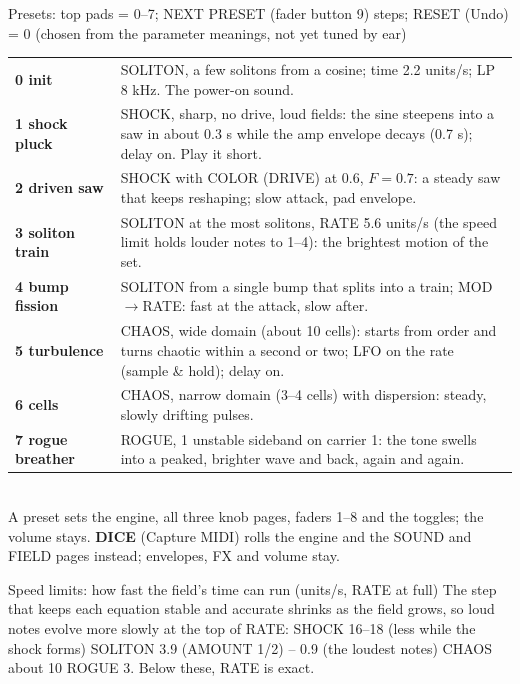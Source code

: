 \documentclass{article}
\newcommand{\EN}[1]{\textcolor{engc}{#1}}
\begin{document}
\vspace{1.5mm}
\begin{minipage}[t]{150mm}\vspace{0pt}
\begin{card}{Presets: top pads = 0--7; NEXT PRESET (fader button 9) steps; RESET (Undo) = 0 \quad\textmd{\fontsize{6.5}{7}\selectfont (chosen from the parameter meanings, not yet tuned by ear)}}
\fontsize{7.2}{8.7}\selectfont
\begin{tabularx}{\linewidth}{@{}>{\bfseries}l L@{}}
0 init & SOLITON, a few solitons from a cosine; time 2.2 units/s; LP 8 kHz. The power-on sound. \\
1 shock pluck & SHOCK, sharp, no drive, loud fields: the sine steepens into a saw in about 0.3 s while the
amp envelope decays (0.7 s); delay on. Play it short. \\
2 driven saw & SHOCK with COLOR (DRIVE) at 0.6, \(F = 0.7\): a steady saw that keeps reshaping; slow attack, pad envelope. \\
3 soliton train & SOLITON at the most solitons, RATE 5.6 units/s (the speed limit holds louder notes to 1--4): the brightest motion of the set. \\
4 bump fission & SOLITON from a single bump that splits into a train; MOD\(\to\)RATE: fast at the attack, slow after. \\
5 turbulence & CHAOS, wide domain (about 10 cells): starts from order and turns chaotic within a second or two;
LFO on the rate (sample \& hold); delay on. \\
6 cells & CHAOS, narrow domain (3--4 cells) with dispersion: steady, slowly drifting pulses. \\
7 rogue breather & ROGUE, 1 unstable sideband on carrier 1: the tone swells into a peaked, brighter
wave and back, again and again. \\
\end{tabularx}\\[0.3mm]
A preset sets the engine, all three knob pages, faders 1--8 and the toggles; the volume stays.
\textbf{DICE} (Capture MIDI) rolls the engine and the SOUND and FIELD pages instead; envelopes, FX and volume stay.
\end{card}

\begin{card}{Speed limits: how fast the field's time can run (units/s, RATE at full)}
\fontsize{7.2}{8.7}\selectfont
The step that keeps each equation stable and accurate shrinks as the field grows, so loud notes evolve more slowly
at the top of RATE: \quad \EN{SHOCK} 16--18 (less while the shock forms) \quad \EN{SOLITON} 3.9 (AMOUNT 1/2) -- 0.9 (the loudest notes)
\quad \EN{CHAOS} about 10 \quad \EN{ROGUE} 3. Below these, RATE is exact.
\end{card}


\end{minipage}
\end{document}
